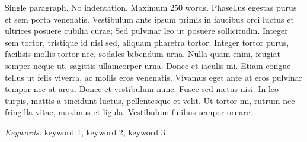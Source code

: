 { %

\relax
{}\relax



\noindent Single paragraph. No indentation. Maximum 250 words. Phasellus egestas purus et sem porta venenatis. Vestibulum ante ipsum primis in faucibus orci luctus et ultrices posuere cubilia curae; Sed pulvinar leo ut posuere sollicitudin. Integer sem tortor, tristique id nisl sed, aliquam pharetra tortor. Integer tortor purus, facilisis mollis tortor nec, sodales bibendum urna. Nulla quam enim, feugiat semper neque ut, sagittis ullamcorper urna. Donec et iaculis mi. Etiam congue tellus ut felis viverra, ac mollis eros venenatis. Vivamus eget ante at eros pulvinar tempor nec at arcu. Donec et vestibulum nunc. Fusce sed metus nisi. In leo turpis, mattis a tincidunt luctus, pellentesque et velit. Ut tortor mi, rutrum nec fringilla vitae, maximus et ligula. Vestibulum finibus semper ornare.


\textit{Keywords:} keyword 1, keyword 2, keyword 3

\vspace{0.75\baselineskip}
}